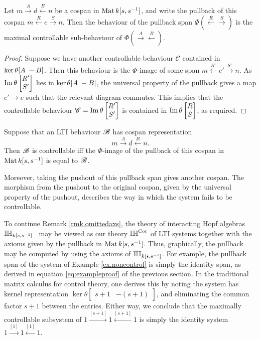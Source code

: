 \begin{proposition} \label{prop.ctrlablepart}
  Let $m \xrightarrow{A} d \xleftarrow{B} n$ be a cospan in $\operatorname{\mathrm{Mat}}{k[s,s^{-1}]}$, and write
  the pullback of this cospan $m \xleftarrow{R} e \xrightarrow{S} n$. Then the
  behaviour of the pullback span $\Phi(\xleftarrow{R}\xrightarrow{S})$ is
  the maximal controllable sub-behaviour of
  $\Phi(\xrightarrow{A}\xleftarrow{B})$.
\end{proposition}
\begin{proof}
  Suppose we have another controllable behaviour $\mathscr{C}$ contained in
  $\ker\theta [A\;-B]$. Then this behaviour is the $\Phi$-image of some span
  $m \xleftarrow{R'} e' \xrightarrow{S'}n$. As $\mathrm{Im}\,\theta\begin{bmatrix} R' \\
    S'\end{bmatrix}$ lies in $\ker\theta [A\;-B]$, the universal property of
  the pullback gives a map $e' \to e$ such that the relevant diagram commutes.
  This implies that the controllable behaviour $\mathscr{C} =
  \mathrm{Im}\,\theta\begin{bmatrix} R' \\ S'\end{bmatrix}$ is contained in $\mathrm{Im}\,\theta
  \begin{bmatrix} R \\ S\end{bmatrix}$, as required. 
\end{proof}

\begin{corollary}
  Suppose that an LTI behaviour ${\mathscr B}$ has cospan representation
  \[
    m \stackrel{A}\longrightarrow d \stackrel{B}\longleftarrow n.
  \]
  Then ${\mathscr B}$ is controllable iff the $\Phi$-image of the pullback of this cospan
  in $\operatorname{\mathrm{Mat}}{k[s,s^{-1}]}$ is equal to ${\mathscr B}$.
\end{corollary}

Moreover, taking the pushout of this pullback span gives another cospan. The
morphism from the pushout to the original cospan, given by the universal
property of the pushout, describes the way in which the system fails to be
controllable.

To continue Remark \ref{rmk.omittedaxs}, the theory of interacting Hopf
algebras $\mathbb{IH}_{k[s,s^{-1}]}$~\cite{BSZ2,Za} may be viewed as our theory $\mathbb{IH}^{\mathrm{Cor}}$ of LTI
systems together with the axioms given by the pullback in $\operatorname{\mathrm{Mat}}{k[s,s^{-1}]}$. Thus,
graphically, the pullback may be computed by using the axioms of $\mathbb{IH}_{k[s,s^{-1}]}$. For
example, the pullback span of the system of Example \ref{ex.noncontrol} is
simply the identity span, as derived in equation \eqref{eq:exampleproof} of the
previous section. In the traditional matrix calculus for control theory, one
derives this by noting the system has kernel representation
$\ker\theta\begin{bmatrix} s+1 & -(s+1) \end{bmatrix}$, and eliminating the
common factor $s+1$ between the entries.  Either way, we conclude that the
maximally controllable subsystem of $1 \xrightarrow{[s+1]} 1 \xleftarrow{[s+1]}
1$ is simply the identity system $1 \xrightarrow{[1]} 1 \xleftarrow{[1]} 1$.

